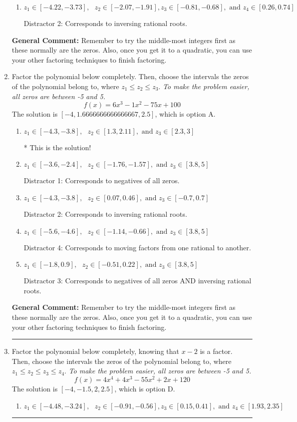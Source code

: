 \documentclass{extbook}[14pt]
\newcommand{\litem}[1]{\item #1

\rule{\textwidth}{0.4pt}}
\begin{document}
\begin{enumerate}
{\begin{enumerate}[label=\Alph*.]
 Distractor 1: Corresponds to negatives of all zeros.
\item \( z_1 \in [-4.22, -3.73], \text{   }  z_2 \in [-2.07, -1.91], z_3 \in [-0.81, -0.68], \text{   and   } z_4 \in [0.26, 0.74] \)

 Distractor 2: Corresponds to inversing rational roots.
\end{enumerate}

\textbf{General Comment:} Remember to try the middle-most integers first as these normally are the zeros. Also, once you get it to a quadratic, you can use your other factoring techniques to finish factoring.
}
\litem{
Factor the polynomial below completely. Then, choose the intervals the zeros of the polynomial belong to, where $z_1 \leq z_2 \leq z_3$. \textit{To make the problem easier, all zeros are between -5 and 5.}
\[ f(x) = 6x^{3} -1 x^{2} -75 x + 100 \]The solution is \( [-4, 1.6666666666666667, 2.5] \), which is option A.\begin{enumerate}[label=\Alph*.]
\item \( z_1 \in [-4.3, -3.8], \text{   }  z_2 \in [1.3, 2.11], \text{   and   } z_3 \in [2.3, 3] \)

* This is the solution!
\item \( z_1 \in [-3.6, -2.4], \text{   }  z_2 \in [-1.76, -1.57], \text{   and   } z_3 \in [3.8, 5] \)

 Distractor 1: Corresponds to negatives of all zeros.
\item \( z_1 \in [-4.3, -3.8], \text{   }  z_2 \in [0.07, 0.46], \text{   and   } z_3 \in [-0.7, 0.7] \)

 Distractor 2: Corresponds to inversing rational roots.
\item \( z_1 \in [-5.6, -4.6], \text{   }  z_2 \in [-1.14, -0.66], \text{   and   } z_3 \in [3.8, 5] \)

 Distractor 4: Corresponds to moving factors from one rational to another.
\item \( z_1 \in [-1.8, 0.9], \text{   }  z_2 \in [-0.51, 0.22], \text{   and   } z_3 \in [3.8, 5] \)

 Distractor 3: Corresponds to negatives of all zeros AND inversing rational roots.
\end{enumerate}

\textbf{General Comment:} Remember to try the middle-most integers first as these normally are the zeros. Also, once you get it to a quadratic, you can use your other factoring techniques to finish factoring.
}
\litem{
Factor the polynomial below completely, knowing that $x-2$ is a factor. Then, choose the intervals the zeros of the polynomial belong to, where $z_1 \leq z_2 \leq z_3 \leq z_4$. \textit{To make the problem easier, all zeros are between -5 and 5.}
\[ f(x) = 4x^{4} +4 x^{3} -55 x^{2} +2 x + 120 \]The solution is \( [-4, -1.5, 2, 2.5] \), which is option D.\begin{enumerate}[label=\Alph*.]
\item \( z_1 \in [-4.48, -3.24], \text{   }  z_2 \in [-0.91, -0.56], z_3 \in [0.15, 0.41], \text{   and   } z_4 \in [1.93, 2.35] \)


\end{enumerate}}
\end{enumerate}
\end{document}
